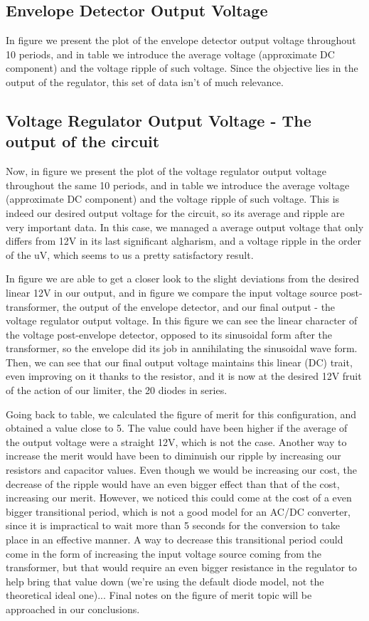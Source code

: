 \subsection{Envelope Detector Output Voltage}
In figure we present the plot of the envelope detector output voltage throughout 10 periods, and in table we introduce the average voltage (approximate DC component) and the voltage ripple of such voltage. Since the objective lies in the output of the regulator, this set of data isn't of much relevance.

\subsection{Voltage Regulator Output Voltage - The output of the circuit}
Now, in figure we present the plot of the voltage regulator output voltage throughout the same 10 periods, and in table we introduce the average voltage (approximate DC component) and the voltage ripple of such voltage. This is indeed our desired output voltage for the circuit, so its average and ripple are very important data. In this case, we managed a average output voltage that only differs from 12V in its last significant algharism, and a voltage ripple in the order of the uV, which seems to us a pretty satisfactory result.

In figure we are able to get a closer look to the slight deviations from the desired linear 12V in our output, and in figure we compare the input voltage source post-transformer, the output of the envelope detector, and our final output - the voltage regulator output voltage. In this figure we can see the linear character of the voltage post-envelope detector, opposed to its sinusoidal form after the transformer, so the envelope did its job in annihilating the sinusoidal wave form. Then, we can see that our final output voltage maintains this linear (DC) trait, even improving on it thanks to the resistor, and it is now at the desired 12V fruit of the action of our limiter, the 20 diodes in series.

Going back to table, we calculated the figure of merit for this configuration, and obtained a value close to 5. The value could have been higher if the average of the output voltage were a straight 12V, which is not the case. Another way to increase the merit would have been to diminuish our ripple by increasing our resistors and capacitor values. Even though we would be increasing our cost, the decrease of the ripple would have an even bigger effect than that of the cost, increasing our merit. However, we noticed this could come at the cost of a even bigger transitional period, which is not a good model for an AC/DC converter, since it is impractical to wait more than 5 seconds for the conversion to take place in an effective manner. A way to decrease this transitional period could come in the form of increasing the input voltage source coming from the transformer, but that would require an even bigger resistance in the regulator to help bring that value down (we're using the default diode model, not the theoretical ideal one)... Final notes on the figure of merit topic will be approached in our conclusions.

\par
